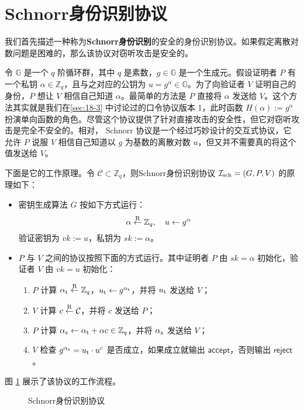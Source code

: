 \section{Schnorr身份识别协议}

我们首先描述一种称为\textbf{Schnorr身份识别}的安全的身份识别协议。如果假定离散对数问题是困难的，那么该协议对窃听攻击是安全的。

令 $\mathbb{G}$ 是一个 $q$ 阶循环群，其中 $q$ 是素数，$g\in\mathbb{G}$ 是一个生成元。假设证明者 $P$ 有一个私钥 $\alpha\in\mathbb{Z}_q$，且与之对应的公钥为 $u=g^{\alpha}\in\mathbb{G}$。为了向验证者 $V$ 证明自己的身份，$P$ 想让 $V$ 相信自己知道 $\alpha$。最简单的方法是 $P$ 直接将 $\alpha$ 发送给 $V$。这个方法其实就是我们在\ref{sec:18-3} 中讨论过的口令协议版本 1，此时函数 $H(\alpha):=g^\alpha$扮演单向函数的角色。尽管这个协议提供了针对直接攻击的安全性，但它对窃听攻击是完全不安全的。相对， Schnorr 协议是一个经过巧妙设计的交互式协议，它允许 $P$ 说服 $V$ 相信自己知道以 $g$ 为基数的离散对数 $u$，但又并不需要真的将这个值发送给 $V$。

下面是它的工作原理。令 $\mathcal{C}\subset\mathbb{Z}_q$，则Schnorr身份识别协议 $\mathcal{I}_{\rm sch}=(G,P,V)$ 的原理如下：
\begin{itemize}
	\item 密钥生成算法 $G$ 按如下方式运行：
		\[
		\alpha\overset{\rm R}\leftarrow\mathbb{Z}_q,
		\quad
		u\leftarrow g^\alpha
		\]
		验证密钥为 $vk:=u$，私钥为 $sk:=\alpha$。
	\item $P$ 与 $V$ 之间的协议按照下面的方式运行。其中证明者 $P$ 由 $sk=\alpha$ 初始化，验证者 $V$ 由 $vk=u$ 初始化：
	\begin{enumerate}
		\item $P$ 计算 $\alpha_{\rm t}\overset{\rm R}\leftarrow\mathbb{Z}_q$，$u_{\rm t}\leftarrow g^{\alpha_{\rm t}}$，并将 $u_{\rm t}$ 发送给 $V$；
		\item $V$ 计算 $c\overset{\rm R}\leftarrow\mathcal{C}$，并将 $c$ 发送给 $P$；
		\item $P$ 计算 $\alpha_{\rm z}\leftarrow \alpha_{\rm t}+\alpha c\in \mathbb{Z}_q$，并将 $\alpha_{\rm z}$ 发送给 $V$；
		\item $V$ 检查 $g^{\alpha_{\rm z}}=u_{\rm t}\cdot u^c$ 是否成立，如果成立就输出 $\mathsf{accept}$，否则输出 $\mathsf{reject}$。
	\end{enumerate}
\end{itemize}
图 \ref{fig:19-1} 展示了该协议的工作流程。

\begin{figure}
  \centering
  
  \caption{Schnorr身份识别协议}
  \label{fig:19-1}
\end{figure}

